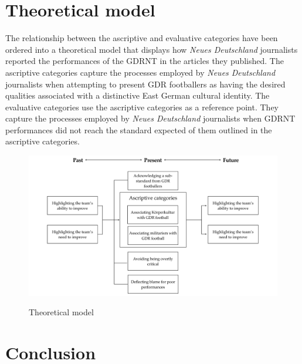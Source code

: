 \section*{Theoretical model}

The relationship between the ascriptive and evaluative categories have been ordered into a theoretical model that displays how \textit{Neues Deutschland} journalists reported the performances of the GDRNT in the articles they published. The ascriptive categories capture the processes employed by \textit{Neues Deutschland} journalists when attempting to present GDR footballers as having the desired qualities associated with a distinctive East German cultural identity. The evaluative categories use the ascriptive categories as a reference point. They capture the processes employed by \textit{Neues Deutschland} journalists when GDRNT performances did not reach the standard expected of them outlined in the ascriptive categories.

\begin{figure}[h]
\caption{Theoretical model}
\includegraphics[width=\textwidth]{mres/images/figure 4.1.pdf}
\centering
\label{fig:fig4.1}
\end{figure}

\section*{Conclusion}

